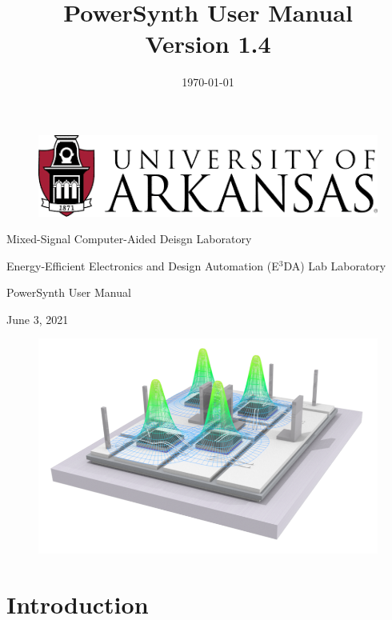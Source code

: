 \documentclass[11pt]{article}
\date{\today}
\title{PowerSynth User Manual \\ Version 1.4}
\renewcommand\maketitle{}
\begin{document}
\maketitle
\begin{titlepage}
\begin{center}

\begin{figure}[h!]
  \centering
  \includegraphics[width=0.4\linewidth]{./figs/00_UarkLogo.png}
\end{figure}

{\Large Mixed-Signal Computer-Aided Deisgn Laboratory \par}
{\Large Energy-Efficient Electronics and Design Automation (E$^3$DA) Lab Laboratory \par}
\vspace{2cm}
{\Huge PowerSynth User Manual \par}
\vspace{1cm}
{\large June 3, 2021 \par}
\vspace{1cm}

\begin{figure}[h!]
  \centering
  \includegraphics[width=\linewidth]{./figs/00_PS.png}
\end{figure}

\end{center}
\end{titlepage}

\tableofcontents
\pagebreak

\section{Introduction}
\label{sec-1}
\end{document}
